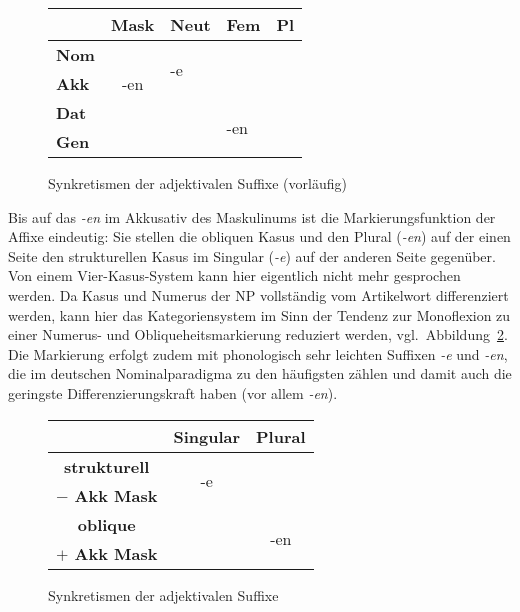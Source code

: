 \begin{figure}[!htbp]
  \centering
  \begin{tabular}{|l|llll|}
    \cline{2-5}
    \multicolumn{1}{c|}{}& \textbf{Mask} & \textbf{Neut} & \textbf{Fem} & \textbf{Pl} \\
    \hline
    \textbf{Nom} && \multirow{2}{*}{-e} & \multicolumn{1}{c|}{} & \\ \cline{2-2}
    \textbf{Akk} & \multicolumn{1}{c|}{-en} && \multicolumn{1}{c|}{} & \\ \cline{2-4}
    \textbf{Dat} &&& \multirow{2}{*}{-en} & \\
    \textbf{Gen} &&&& \\
    \hline
  \end{tabular}
  \caption{Synkretismen der adjektivalen Suffixe (vorläufig)}
  \label{fig:schwacheadj}
\end{figure}

Bis auf das \textit{-en} im Akkusativ des Maskulinums ist die Markierungsfunktion der Affixe eindeutig:
Sie stellen die obliquen Kasus und den Plural (\textit{-en}) auf der einen Seite den strukturellen Kasus im Singular (\textit{-e}) auf der anderen Seite gegenüber.
Von einem Vier-Kasus-System kann hier eigentlich nicht mehr gesprochen werden.
Da Kasus und Numerus der NP vollständig vom Artikelwort differenziert werden, kann hier das Kategoriensystem im Sinn der Tendenz zur Monoflexion zu einer Numerus- und Obliqueheitsmarkierung reduziert werden, vgl.\ Abbildung~\ref{fig:schwacheadj-r}.
Die Markierung erfolgt zudem mit phonologisch sehr leichten Suffixen \textit{-e} und \textit{-en}, die im deutschen Nominalparadigma zu den häufigsten zählen und damit auch die geringste Differenzierungskraft haben (vor allem \textit{-en}).


\begin{figure}[!htbp]
  \centering
  \begin{tabular}{|l|c|c|}
    \cline{2-3}
    \multicolumn{1}{c|}{} & \multicolumn{1}{c|}{\textbf{Singular}} & \multicolumn{1}{c|}{\textbf{Plural}} \\
    \hline
    \multicolumn{1}{|c|}{\textbf{strukturell}} & \multirow{2}{*}{-e} &  \\
    \multicolumn{1}{|c|}{\textbf{$-$ Akk Mask}} &  &  \\
    \cline{1-2}
    \multicolumn{1}{|c|}{\textbf{oblique}} & \multicolumn{1}{c}{} & \multirow{2}{*}{-en} \\
    \multicolumn{1}{|c|}{\textbf{$+$ Akk Mask}} & \multicolumn{1}{c}{} & \\
    \hline
  \end{tabular}
  \caption{Synkretismen der adjektivalen Suffixe}
  \label{fig:schwacheadj-r}
\end{figure}

